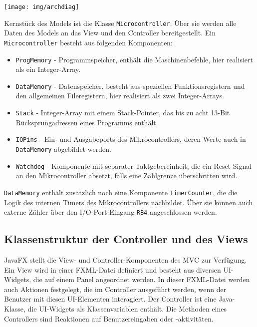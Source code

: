 \documentclass[a4paper]{article}
\begin{document}
\begin{center}
    \texttt{[image: img/archdiag]}
\end{center}

Kernstück des Models ist die Klasse \texttt{Microcontroller}.
Über sie werden alle Daten des Models an das View und den Controller bereitgestellt.
Ein \texttt{Microcontroller} besteht aus folgenden Komponenten:

\begin{itemize}
    \item \texttt{ProgMemory} - Programmspeicher, enthält die Maschinenbefehle, hier realisiert als ein Integer-Array.
    \item \texttt{DataMemory} - Datenspeicher, besteht aus speziellen Funktionsregistern und den allgemeinen Fileregistern, hier realisiert als zwei Integer-Arrays.
    \item \texttt{Stack} - Integer-Array mit einem Stack-Pointer, das bis zu acht 13-Bit Rücksprungadressen eines Programms enthält.
    \item \texttt{IOPins} - Ein- und Ausgabeports des Mikrocontrollers, deren Werte auch in \texttt{DataMemory} abgebildet werden.
    \item \texttt{Watchdog} - Komponente mit separater Taktgebereinheit, die ein Reset-Signal an den Mikrocontroller absetzt, falls eine Zählgrenze überschritten wird.
\end{itemize}

\texttt{DataMemory} enthält zusätzlich noch eine Komponente \texttt{TimerCounter}, die die Logik des internen Timers des Mikrocontrollers nachbildet.
Über sie können auch externe Zähler über den I/O-Port-Eingang \texttt{RB4} angeschlossen werden.

\subsection{Klassenstruktur der Controller und des Views}

JavaFX stellt die View- und Controller-Komponenten des MVC zur Verfügung.
Ein View wird in einer FXML-Datei definiert und besteht aus diversen UI-Widgets, die auf einem Panel angeordnet werden.
In dieser FXML-Datei werden auch Aktionen festgelegt, die im Controller ausgeführt werden, wenn der Benutzer mit diesen UI-Elementen interagiert.
Der Controller ist eine Java-Klasse, die UI-Widgets als Klassenvariablen enthält.
Die Methoden eines Controllers sind Reaktionen auf Benutzereingaben oder -aktivitäten.
\end{document}
